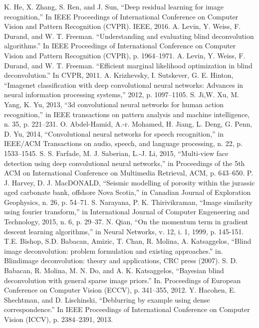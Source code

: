 \documentclass[conference,compsoc]{IEEEtran}
\begin{document}
\begin{thebibliography}{1}
			K. He, X. Zhang, S. Ren, and J. Sun, ``Deep residual learning for image recognition,'' In IEEE Proceedings of International Conference on Computer Vision and Pattern Recognition (CVPR). IEEE, 2016.
			A. Levin, Y. Weiss, F. Durand, and W. T. Freeman. ``Understanding and evaluating blind deconvolution algorithms.'' In IEEE Proceedings of International Conference on Computer Vision and Pattern Recognition (CVPR), p. 1964–1971.
		A. Levin, Y. Weiss, F. Durand, and W. T. Freeman. ``Efficient marginal likelihood optimization in blind deconvolution.'' In CVPR, 2011.
		A. Krizhevsky, I. Sutskever, G. E. Hinton, ``Imagenet classification with deep convolutional neural networks: Advances in neural information processing systems,'' 2012, p. 1097–1105.
			S. Ji,W. Xu, M. Yang, K. Yu, 2013, ``3d convolutional neural networks for human action recognition,'' in IEEE transactions on pattern analysis and machine intelligence, n. 35, p. 221–231.
		O. Abdel-Hamid, A.-r. Mohamed, H. Jiang, L. Deng, G. Penn, D. Yu, 2014, ``Convolutional neural networks for speech recognition,'' in IEEE/ACM Transactions on audio, speech, and language processing, n. 22, p. 1533–1545.
		S. S. Farfade, M. J. Saberian, L.-J. Li, 2015, ``Multi-view face detection using deep convolutional neural networks,'' in Proceedings of the 5th ACM on International Conference on Multimedia Retrieval, ACM, p. 643–650.
 		P. J. Harvey, D. J. MacDONALD, ``Seismic modelling of porosity within the jurassic aged carbonate bank, offshore Nova Scotia,'' in  Canadian Journal of Exploration Geophysics, n. 26, p. 54–71.
		S. Narayana, P. K. Thirivikraman, ``Image similarity using fourier transform,'' in International Journal of Computer Engeneering and Technology, 2015, n. 6, p. 29–37.
			N. Qian, ``On the momentum term in gradient descent learning algorithms,'' in Neural Networks, v. 12, i. 1, 1999, p. 145-151.
		T.E. Bishop, S.D. Babacan, Amizic, T. Chan, R. Molina, A. Katsaggelos, ``Blind image deconvolution: problem formulation and existing approaches.'' in. Blindimage deconvolution: theory and applications,  CRC press (2007).
		S. D. Babacan, R. Molina, M. N. Do, and A. K. Katsaggelos, ``Bayesian blind deconvolution with general sparse image priors.'' In. Proceedings of European Conference on Computer Vision (ECCV), p. 341–355, 2012.
		Y. Hacohen, E. Shechtman, and D. Lischinski, ``Deblurring by example using dense correspondence.'' In IEEE Proceedings of International Conference on Computer Vision (ICCV), p. 2384–2391, 2013.

\end{thebibliography}
\end{document}
